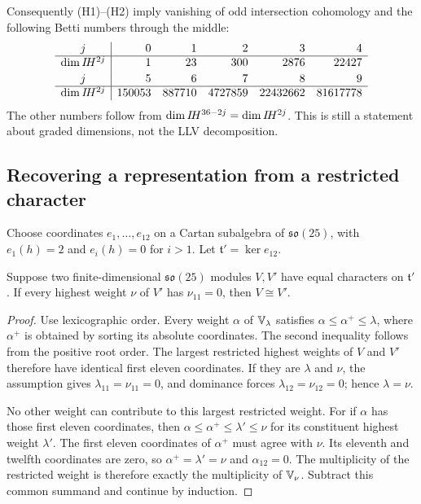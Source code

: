 Consequently (H1)--(H2) imply vanishing of odd intersection
cohomology and the following Betti numbers through the middle:
\begin{equation}\label{eq:Betti}
\begin{array}{c|rrrrr}
 j&0&1&2&3&4\\\hline
 \dim I\!H^{2j}&1&23&300&2876&22427\\[2pt]
 j&5&6&7&8&9\\\hline
 \dim I\!H^{2j}&150053&887710&4727859&22432662&81617778
\end{array}
\end{equation}
The other numbers follow from
$\dim I\!H^{36-2j}=\dim I\!H^{2j}$. This is still a statement
about graded dimensions, not the LLV decomposition.

\subsection{Recovering a representation from a restricted character}
Choose coordinates $e_1,\ldots,e_{12}$ on a Cartan subalgebra
of $\mathfrak{so}(25)$, with $e_1(h)=2$ and $e_i(h)=0$
for $i>1$. Let $\mathfrak t'=\ker e_{12}$.

\begin{lemma}\label{lem:restriction}
Suppose two finite-dimensional $\mathfrak{so}(25)$ modules
$V,V'$ have equal characters on $\mathfrak t'$. If every
highest weight $\nu$ of $V'$ has $\nu_{11}=0$, then
$V\cong V'$.
\end{lemma}
\begin{proof}
Use lexicographic order. Every weight $\alpha$ of
$\mathbb V_\lambda$ satisfies $\alpha\le\alpha^+\le\lambda$,
where $\alpha^+$ is obtained by sorting its absolute
coordinates. The second inequality follows from the positive
root order. The largest restricted highest weights of $V$
and $V'$ therefore have identical first eleven coordinates.
If they are $\lambda$ and $\nu$, the assumption gives
$\lambda_{11}=\nu_{11}=0$, and dominance forces
$\lambda_{12}=\nu_{12}=0$; hence $\lambda=\nu$.

No other weight can contribute to this largest restricted
weight. For if $\alpha$ has those first eleven coordinates,
then $\alpha\le\alpha^+\le\lambda'\le\nu$ for its
constituent highest weight $\lambda'$. The first eleven
coordinates of $\alpha^+$ must agree with $\nu$. Its
eleventh and twelfth coordinates are zero, so
$\alpha^+=\lambda'=\nu$ and $\alpha_{12}=0$.
The multiplicity of the restricted weight is therefore exactly
the multiplicity of $\mathbb V_\nu$. Subtract this common summand
and continue by induction.
\end{proof}

